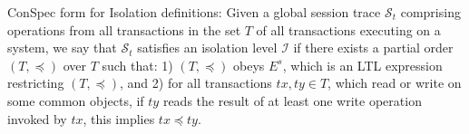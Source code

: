 \documentclass[acmlarge, ,11pt]{acmart}
\begin{document}
  \begin{definition}{ConSpec form for Isolation definitions:}\label{def:form0} 
Given a global session trace $\mathcal{S}_t$ comprising %
 operations from all transactions in the set $T$ of all transactions executing on a system, %
we say  that   $\mathcal{S}_t$ satisfies an isolation level $\mathcal{I}$
 if there exists a partial order  $\left( T, \preccurlyeq \right)$ over $T$ %
 such that:  %
 1) $\left( T, \preccurlyeq \right)$ obeys $E^s$, which is an LTL expression restricting $\left( T, \preccurlyeq \right)$, and 2) for all transactions $\mathit{tx}, \mathit{ty} \in T$, which read or write on some common objects, %
if $ {\mathit{ty}}$ reads the result of at least one write operation invoked by $ {\mathit{tx}}$, this  implies $\mathit{tx} \preccurlyeq \mathit{ty}$. %

\end{definition}
\end{document}
